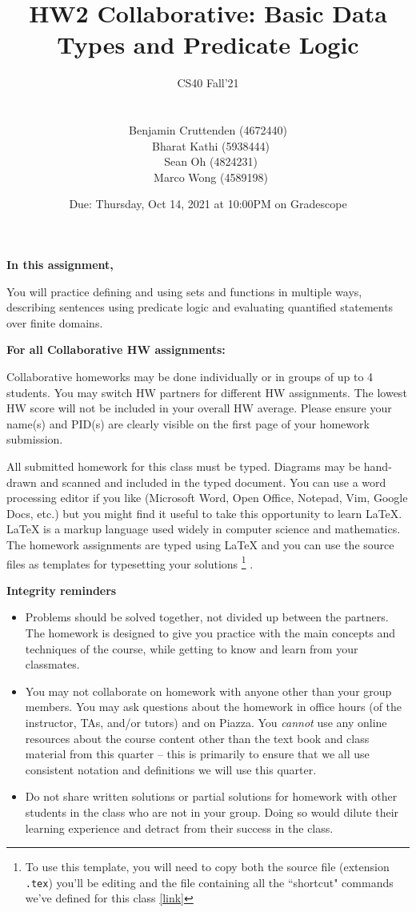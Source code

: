 \documentclass[12pt, oneside]{article}
\title{HW2 Collaborative: Basic Data Types and Predicate Logic}
\author{CS40 Fall'21\\\\\\
Benjamin Cruttenden (4672440)\\\
Bharat Kathi (5938444)\\\
Sean Oh (4824231)\\\
Marco Wong (4589198)}
\date{Due: Thursday, Oct 14, 2021 at 10:00PM on Gradescope}
\begin{document}
\maketitle


{\bf In this assignment,}

You will practice defining and using sets and functions in multiple ways, describing sentences using predicate logic and evaluating quantified statements over finite domains.

{\bf For all Collaborative HW assignments:}

Collaborative homeworks may be done individually or in groups of up to 4 students. You may switch HW partners for different HW assignments. The lowest HW score will not be included in your overall HW average. Please ensure your name(s) and PID(s) are clearly visible on the first page of your homework submission.

All submitted homework for this class must be typed. Diagrams may be hand-drawn and scanned and included in the typed document. You can use a word processing editor if you like (Microsoft Word, Open Office, Notepad, Vim, Google Docs, etc.) but you might find it useful to take this opportunity to learn LaTeX. LaTeX is a markup language used widely in computer science and mathematics. The homework assignments are typed using LaTeX and you can use the source files as templates for typesetting your solutions
\footnote{To use this template, you will need to copy both the source file (extension \texttt{.tex})  you'll be editing and the file containing all the ``shortcut" commands we've defined for this class \href{https://drive.google.com/file/d/1FmQvgByKnNjTpIkAUw31TGWYrQZM-HK0/view?usp=sharing}{[link]}} .


{\bf Integrity reminders}
\begin{itemize}
\item Problems should be solved together, not divided up between the partners. The homework is
designed to give you practice with the main concepts and techniques of the course, while getting to know and learn from your classmates.
\item You may not collaborate on homework with anyone other than your group members.
You may ask questions about the homework in office hours (of the instructor, TAs, and/or tutors) and 
on Piazza.  You \emph{cannot} use any online resources about the course content other than the text
book and class material from this quarter -- this is primarily to ensure that we all use consistent notation and
definitions we will use this quarter.
\item Do not share written solutions or partial solutions for homework with other students in the class who are not in your group. Doing so would dilute their learning experience and detract from their success in the class.
\end{itemize}
\end{document}
